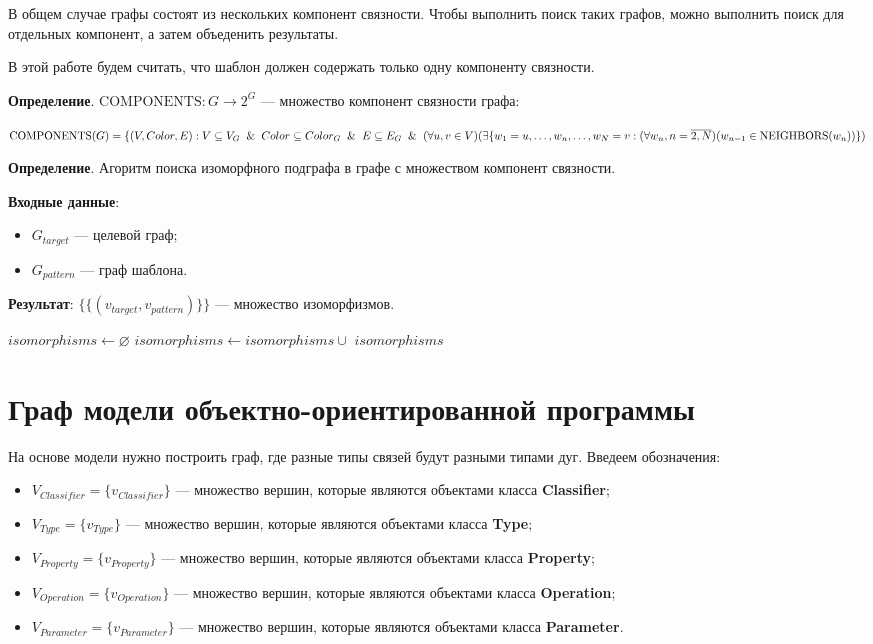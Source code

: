В общем случае графы состоят из нескольких компонент связности.
Чтобы выполнить поиск таких графов, можно выполнить поиск для отдельных компонент,
а затем объеденить результаты.

В этой работе будем считать, что шаблон должен содержать только одну
компоненту связности.

\textbf{Определение}. $\textrm{COMPONENTS} : G \to 2^G$ --- множество компонент
связности графа:

$\textrm{COMPONENTS}(G) = \{ (V, Color, E) : V \subseteq V_G \And Color \subseteq Color_G \And E \subseteq E_G \And (\forall u, v \in V)(\exists \{ w_1 = u, \dots, w_n, \dots, w_N = v : (\forall w_n, n=\overline{2,N})(w_{n-1} \in \textrm{NEIGHBORS}(w_n)) \})$

\textbf{Определение}. Агоритм поиска изоморфного подграфа в графе с множеством
компонент связности.

\textbf{Входные данные}:
\begin{itemize}
\item $G_{target}$ --- целевой граф;
\item $G_{pattern}$ --- граф шаблона.
\end{itemize}

\textbf{Результат}: $\{ \{ ( v_{target}, v_{pattern} ) \} \}$ --- множество
изоморфизмов.

\begin{algorithmic}
    \State $isomorphisms \gets \varnothing$
        \State $isomorphisms \gets isomorphisms \cup$ 
    \EndFor
    \State \Return $isomorphisms$
\EndFunction
\end{algorithmic}

\section{Граф модели объектно-ориентированной программы}

На основе модели нужно построить граф, где разные типы связей будут разными типами дуг.
Введеем обозначения:
\begin{itemize}
\item $V_{Classifier} = \{ v_{Classifier} \}$ --- множество вершин, которые являются объектами класса \textbf{Classifier};
\item $V_{Type} = \{ v_{Type} \}$ --- множество вершин, которые являются объектами класса \textbf{Type};
\item $V_{Property} = \{ v_{Property} \}$ --- множество вершин, которые являются объектами класса \textbf{Property};
\item $V_{Operation} = \{ v_{Operation} \}$ --- множество вершин, которые являются объектами класса \textbf{Operation};
\item $V_{Parameter} = \{ v_{Parameter} \}$ --- множество вершин, которые являются объектами класса \textbf{Parameter}.
\end{itemize}

